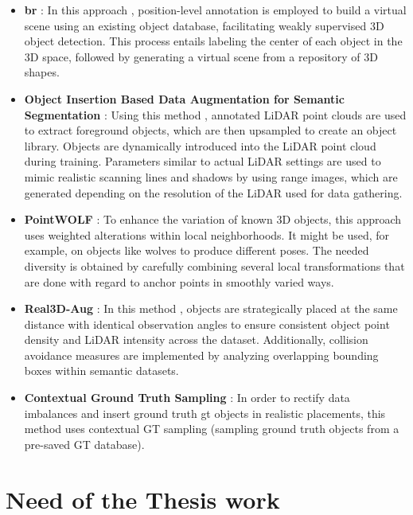 \begin{itemize}
    \item \textbf{\acrfull{br}} : In this approach \parencite{xu2022reality}, position-level annotation is employed to build a virtual scene using an existing object database, facilitating weakly supervised 3D object detection. This process entails labeling the center of each object in the 3D space, followed by generating a virtual scene from a repository of 3D shapes.
    \item \textbf{Object Insertion Based Data Augmentation for Semantic Segmentation} : Using this method \parencite{9811816}, annotated LiDAR point clouds are used to extract foreground objects, which are then upsampled to create an object library. Objects are dynamically introduced into the LiDAR point cloud during training. Parameters similar to actual LiDAR settings are used to mimic realistic scanning lines and shadows by using range images, which are generated depending on the resolution of the LiDAR used for data gathering.
    \item \textbf{PointWOLF} : To enhance the variation of known 3D objects, this approach \parencite{pointwolf_2021} uses weighted alterations within local neighborhoods. It might be used, for example, on objects like wolves to produce different poses. The needed diversity is obtained by carefully combining several local transformations that are done with regard to anchor points in smoothly varied ways.
    \item \textbf{Real3D-Aug} : In this method \parencite{sebek2022real3daug}, objects are strategically placed at the same distance with identical observation angles to ensure consistent object point density and LiDAR intensity across the dataset. Additionally, collision avoidance measures are implemented by analyzing overlapping bounding boxes within semantic datasets.
    \item \textbf{Contextual Ground Truth Sampling} : In order to rectify data imbalances and insert ground truth \acrshort{gt} objects in realistic placements, this method \parencite{lee2022resolving} uses contextual GT sampling (sampling ground truth objects from a pre-saved GT database).
\end{itemize}

\section{Need of the Thesis work}

